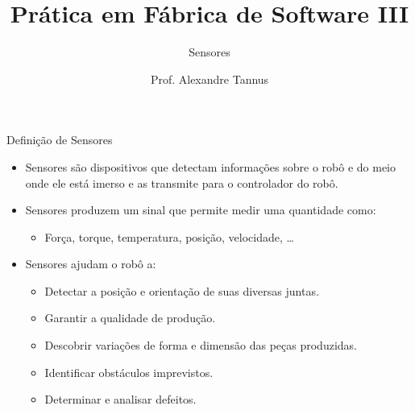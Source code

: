 \documentclass[aspectratio=169,
				xcolor=table]{beamer}
\institute[]{\uppercase{Engenharia da Computação}}
\title[]{Prática em Fábrica de Software III}
\subtitle[]{Sensores}
\author[]{Prof. Alexandre Tannus}
\date{}
\begin{document}
	\begin{frame}
		\titlepage
	\end{frame}
	

		
		\begin{frame}{Definição de Sensores}
			\begin{itemize}
				\item Sensores são dispositivos que detectam informações sobre o robô e do meio onde ele está imerso e as transmite para o controlador do robô.
				\vspace{1em}
				\item Sensores produzem um sinal que permite medir uma quantidade como:
				\begin{itemize}
					\item Força, torque, temperatura, posição, velocidade, …
				\end{itemize}
			\end{itemize}
		\end{frame}
		
		\begin{frame}
			\begin{itemize}
				\item Sensores ajudam o robô a:
				\begin{itemize}
					\item Detectar a posição e orientação de suas diversas juntas. 
					\item Garantir a qualidade de produção.
					\item Descobrir variações de forma e dimensão das peças produzidas.
					\item Identificar obstáculos imprevistos.
					\item Determinar e analisar defeitos.
				\end{itemize}
			\end{itemize}	
		\end{frame}
		
\end{document}
